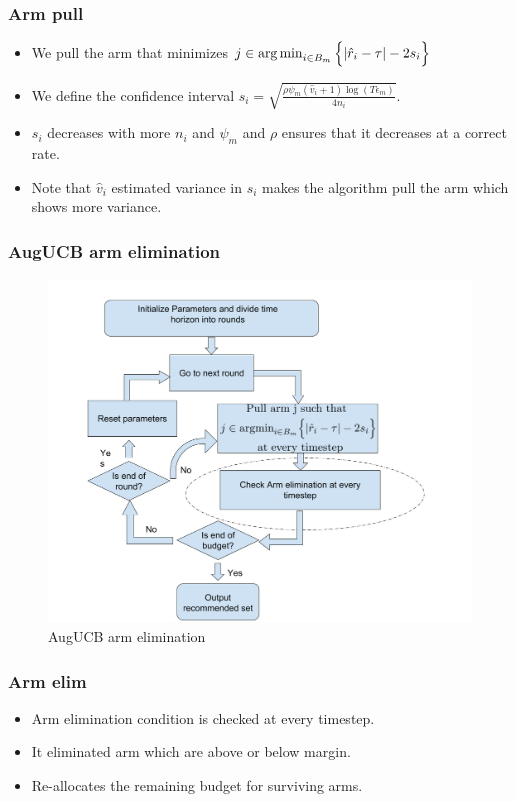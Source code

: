 \begin{frame}
\frametitle{Arm pull}
\begin{itemize}
\item<1-> We pull the arm that minimizes $j\in\operatorname*{arg\,min}_{i\in B_{m}}\Big\lbrace |\hat{r}_{i} - \tau | - 2s_{i}\Big\rbrace$
\item<2-> We define the confidence interval $s_i  = \sqrt{\frac{\rho\psi_m (\hat{v}_{i}+1) \log ( T \epsilon_{m})}{4 n_{i}}}$.
\item<3-> $s_i$ decreases with more $n_i$ and $\psi_m$ and $\rho$ ensures that it decreases at a correct rate.
\item<4-> Note that $\hat{v}_i$ estimated variance in $s_i$ makes the algorithm pull the arm which shows more variance. 
\end{itemize}
\end{frame}

\begin{frame}
\frametitle{AugUCB arm elimination}
\begin{figure}
\caption{AugUCB arm elimination}
\includegraphics[scale=0.178]{img/AugUCB_flow_elim.png}
\end{figure}
\end{frame}


\begin{frame}
\frametitle{Arm elim}
\begin{itemize}
\item<1-> Arm elimination condition is checked at every timestep.
\item<2-> It eliminated arm which are above or below margin.
\item<3-> Re-allocates the remaining budget for surviving arms. 
\end{itemize}
\end{frame}


